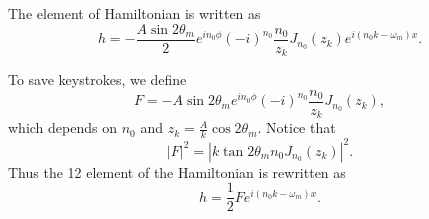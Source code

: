 The element of Hamiltonian is written as
\begin{equation}
   h = - \frac{A\sin 2\theta_m}{2} e^{in_0\phi} (-i)^{n_0} \frac{n_0}{z_k} J_{n_0 }(z_k) e^{i(n_0 k -\omega_m)x}.
\end{equation}

To save keystrokes, we define
\begin{equation}
   F = - A\sin 2\theta_m e^{i n_0 \phi} (-i)^{n_0} \frac{n_0}{z_k} J_{n_0} (z_k) ,
   \label{chap:matter-sec:deep-jacobi-subsec:single-matter-freq-eqn:definition-F} 
\end{equation}
which depends on $n_0$ and $z_k = \frac{A}{k} \cos 2\theta_m$. Notice that
\begin{equation}
   \lvert F \rvert^2 = \left\lvert  k \tan 2\theta_m  n_0 J_{n_0} (z_k) \right\rvert^2 .
\end{equation}
Thus the 12 element of the Hamiltonian is rewritten as
\begin{equation}
   h = \frac{1}{2}F e^{i(n_0 k -\omega_m)x}.
   \label{chap:matter-sec:deep-jacobi-subsec:single-matter-freq-eqn:eqn-12-element-and-F}
\end{equation}






